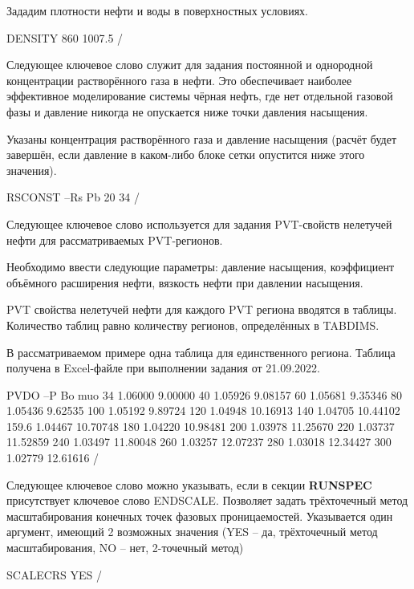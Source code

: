 Зададим плотности нефти и воды в поверхностных условиях.
\begin{eclrun}
DENSITY 
860  1007.5  /
\end{eclrun}

Следующее ключевое слово служит для задания постоянной и однородной концентрации растворённого газа в нефти.
Это обеспечивает наиболее эффективное моделирование системы чёрная нефть, где нет отдельной газовой фазы и давление никогда не опускается ниже точки давления насыщения.

Указаны концентрация растворённого газа и давление насыщения (расчёт будет завершён, если давление в каком-либо блоке сетки опустится ниже этого значения).
\begin{eclrun}
RSCONST 
--Rs  Pb
  20  34  /
\end{eclrun}


Следующее ключевое слово используется для задания PVT-свойств нелетучей нефти для рассматриваемых PVT-регионов.

Необходимо ввести следующие параметры: давление насыщения, коэффициент объёмного расширения нефти, вязкость нефти при давлении насыщения.

PVT свойства нелетучей нефти для каждого PVT региона вводятся в таблицы.
Количество таблиц равно количеству регионов, определённых в TABDIMS.

В рассматриваемом примере одна таблица для единственного региона.
Таблица получена в Excel-файле при выполнении задания от 21.09.2022.

\begin{eclrun}
PVDO 
--P     Bo      muo
34     1.06000  9.00000
40     1.05926  9.08157
60     1.05681  9.35346
80     1.05436  9.62535
100    1.05192  9.89724
120    1.04948  10.16913
140    1.04705  10.44102
159.6  1.04467  10.70748
180    1.04220  10.98481
200    1.03978  11.25670
220    1.03737  11.52859
240    1.03497  11.80048
260    1.03257  12.07237
280    1.03018  12.34427
300    1.02779  12.61616
/
\end{eclrun}

Следующее ключевое слово можно указывать, если в секции \textbf{RUNSPEC} присутствует ключевое слово ENDSCALE.
Позволяет задать трёхточечный метод масштабирования конечных точек фазовых проницаемостей.
Указывается один аргумент, имеющий 2 возможных значения (YES -- да, трёхточечный метод масштабирования, NO -- нет, 2-точечный метод)
\begin{eclrun}
SCALECRS
YES /
\end{eclrun}


